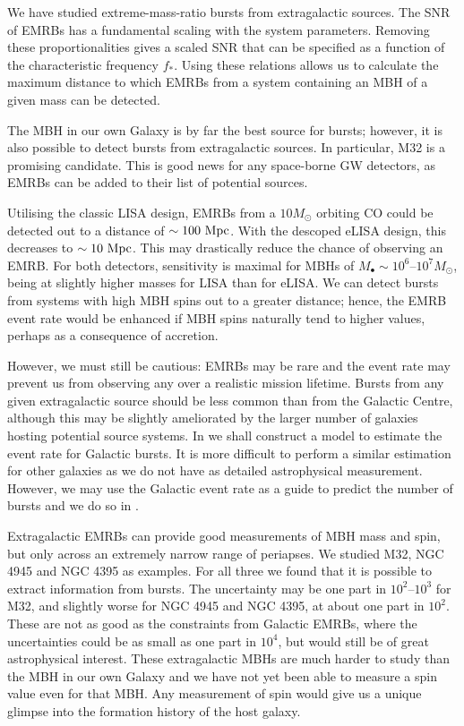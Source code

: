 We have studied extreme-mass-ratio bursts from extragalactic sources. The SNR of EMRBs has a fundamental scaling with the system parameters. Removing these proportionalities gives a scaled SNR that can be specified as a function of the characteristic frequency $f_\ast$. Using these relations allows us to calculate the maximum distance to which EMRBs from a system containing an MBH of a given mass can be detected.

The MBH in our own Galaxy is by far the best source for bursts; however, it is also possible to detect bursts from extragalactic sources. In particular, M32 is a promising candidate. This is good news for any space-borne GW detectors, as EMRBs can be added to their list of potential sources.

Utilising the classic LISA design, EMRBs from a $10 M_\odot$ orbiting CO could be detected out to a distance of $\sim 100~\mathrm{Mpc}$. With the descoped eLISA design, this decreases to $\sim 10~\mathrm{Mpc}$. This may drastically reduce the chance of observing an EMRB. For both detectors, sensitivity is maximal for MBHs of $M_\bullet \sim 10^6$--$10^7 M_\odot$, being at slightly higher masses for LISA than for eLISA. We can detect bursts from systems with high MBH spins out to a greater distance; hence, the EMRB event rate would be enhanced if MBH spins naturally tend to higher values, perhaps as a consequence of accretion.

However, we must still be cautious: EMRBs may be rare and the event rate may prevent us from observing any over a realistic mission lifetime. Bursts from any given extragalactic source should be less common than from the Galactic Centre, although this may be slightly ameliorated by the larger number of galaxies hosting potential source systems. In  we shall construct a model to estimate the event rate for Galactic bursts. It is more difficult to perform a similar estimation for other galaxies as we do not have as detailed astrophysical measurement. However, we may use the Galactic event rate as a guide to predict the number of bursts and we do so in .

Extragalactic EMRBs can provide good measurements of MBH mass and spin, but only across an extremely narrow range of periapses. We studied M32, NGC 4945 and NGC 4395 as examples. For all three we found that it is possible to extract information from bursts. The uncertainty may be one part in $10^2$--$10^3$ for M32, and slightly worse for NGC 4945 and NGC 4395, at about one part in $10^2$. These are not as good as the constraints from Galactic EMRBs, where the uncertainties could be as small as one part in $10^4$, but would still be of great astrophysical interest. These extragalactic MBHs are much harder to study than the MBH in our own Galaxy and we have not yet been able to measure a spin value even for that MBH. Any measurement of spin would give us a unique glimpse into the formation history of the host galaxy.

